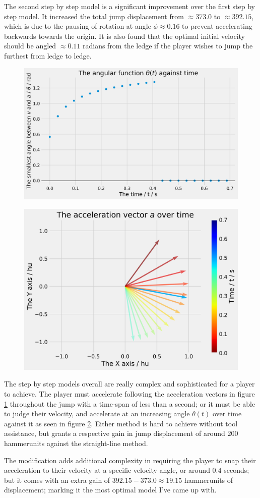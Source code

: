 The second step by step model is a significant improvement over the first step by step model. It increased the total jump displacement from $\approx 373.0$ to $\approx 392.15$, which is due to the pausing of rotation at angle $\phi \approx 0.16$ to prevent accelerating backwards towards the origin. It is also found that the optimal initial velocity should be angled $\approx 0.11$ radians from the ledge if the player wishes to jump the furthest from ledge to ledge.

\begin{figure}[H]
    \centering
    \includegraphics[width=0.7\linewidth]{assets/step_by_step_acc.png}
        \caption{}
        \label{fig:sbsa}
\end{figure}

\begin{figure}[H]
    \centering
   \includegraphics[width=0.7\linewidth]{assets/step_by_step_acc_v.png}
        \caption{}
        \label{fig:sbsav}
\end{figure}

The step by step models overall are really complex and sophisticated for a player to achieve. The player must accelerate 
following the acceleration vectors in figure \ref{fig:sbsa} throughout the jump with a time-span of less than a second; or it must be able to judge their velocity, and accelerate at an increasing angle $\theta(t)$ over time against it as seen in figure \ref{fig:sbsav}. Either method is hard to achieve without tool assistance, but grants a respective gain in jump displacement of around $200$ hammerunits against the straight-line method.

The modification adds additional complexity in requiring the player to snap their acceleration to their velocity at a specific velocity angle, or around $0.4$ seconds; but it comes with an extra gain of $392.15-373.0\approx19.15$ hammerunits of displacement; marking it the most optimal model I've came up with.


